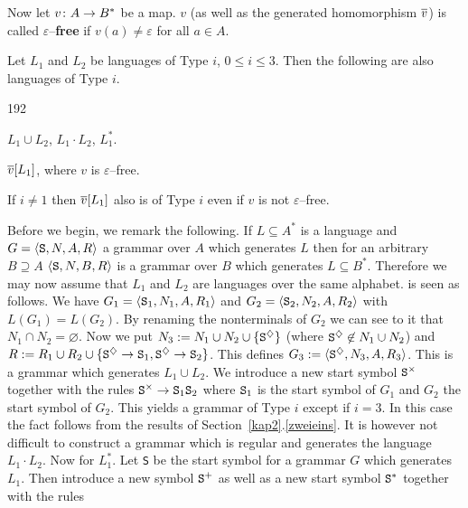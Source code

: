 Now let $v \colon A \rightarrow B^{\ast}$ be a map. $v$ (as well as the generated
homomorphism $\overline{v}$) is called $\varepsilon$--\textbf{free}
if $v(a) \neq \varepsilon$ for all $a \in A$.
\begin{thm}
\label{thm:afl}
Let $L_1$ and  $L_2$ be languages of Type $i$, $0 \leq i \leq 3$.
Then the following are also languages of Type $i$.
\begin{dingautolist}{192}
\item $L_1 \cup L_2$, $L_1 \cdot L_2$, $L_1^{\ast}.$
\item $\overline{v}[L_1]$, where $v$ is $\varepsilon$--free.
\end{dingautolist}
If $i \neq 1$ then  $\overline{v}[L_1]$ also is of Type $i$ even if
$v$ is not $\varepsilon$--free.
\end{thm}
\proofbeg
Before we begin, we remark the following. If $L \subseteq A^{\ast}$
is a language and $G = \langle \mbox{\tt S}, N, A, R\rangle$ a grammar over $A$
which generates $L$ then for an arbitrary $B \supseteq A$
$\langle \mbox{\tt S}, N, B, R\rangle$ is a  grammar over $B$ which generates $L
\subseteq B^{\ast}$. Therefore we may now assume that
$L_1$ and $L_2$ are languages over the same alphabet.
 is seen as follows. We have $G_1 =
\langle \mbox{\tt S}_1, N_1, A, R_1\rangle$ and $G_2 = \langle \mbox{\tt S}_2,
N_2, A, R_2\rangle$ with $L(G_1) = L(G_2)$. By renaming the nonterminals
of $G_2$ we can see to it that $N_1 \cap N_2 = \varnothing$.
Now we put $N_3 := N_1 \cup N_2 \cup \{\mbox{\tt S}^{\diamondsuit}\}$
(where $\mbox{\tt S}^{\diamondsuit} \not\in N_1 \cup N_2$)
and $R := R_1 \cup R_2 \cup \{\mbox{\tt S}^{\diamondsuit} \rightarrow \mbox{\tt S}_1,
\mbox{\tt S}^{\diamondsuit} \rightarrow \mbox{\tt S}_2\}$. This defines
$G_3 := \langle \mbox{\tt S}^{\diamondsuit}, N_3, A, R_3\rangle$.
This is a grammar which generates $L_1 \cup L_2$. We introduce a new 
start symbol
$\mbox{\tt S}^{\times}$ together with the rules $\mbox{\tt S}^{\times} \rightarrow
\mbox{\tt S}_1 \mbox{\tt S}_2$ where $\mbox{\tt S}_1$
is the  start symbol of $G_1$ and $G_2$ the start symbol of $G_2$.
This yields a grammar of Type $i$ except if $i = 3$.
In this case the fact follows from the results of
Section~\ref{kap2}.\ref{zweieins}. It is however not difficult to construct
a grammar which is regular and generates the language
$L_1 \cdot L_2$.  Now for $L_1^{\ast}$. Let {\tt S} be the
start symbol for a grammar $G$ which generates $L_1$.
Then introduce a new symbol $\mbox{\tt S}^+$ as well as a new
start symbol $\mbox{\tt S}^{\ast}$ together with the rules
